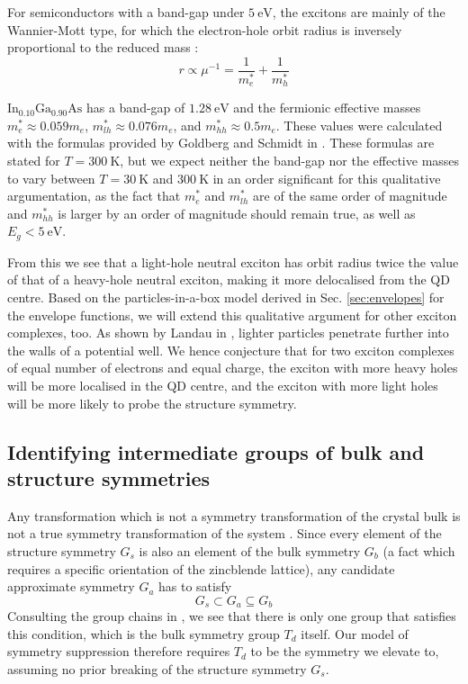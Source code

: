 For semiconductors with a band-gap under $\SI{5}{\electronvolt}$, the excitons are mainly of the Wannier-Mott type, for which the electron-hole orbit radius is inversely proportional to the reduced mass \cite[p. 78]{fox}:
\begin{equation}
r\propto \mu^{-1} = \frac{1}{m_e^*}+\frac{1}{m_h^*}
\end{equation}

$\text{In}_{0.10}\text{Ga}_{0.90}\text{As}$ has a band-gap of $\SI{1.28}{\electronvolt}$ and the fermionic effective masses $m^*_e\approx 0.059m_e$, $m^*_{lh}\approx 0.076m_e$, and $m^*_{hh}\approx 0.5m_e$. These values were calculated with the formulas provided by Goldberg and Schmidt in \cite[p. 62]{semiconductor_handbook}. These formulas are stated for $T=\SI{300}{\kelvin}$, but we expect neither the band-gap nor the effective masses to vary between $T=\SI{30}{\kelvin}$ and $\SI{300}{\kelvin}$ in an order significant for this qualitative argumentation, as the fact that $m_e^*$ and $m_{lh}^*$ are of the same order of magnitude and $m_{hh}^*$ is larger by an order of magnitude should remain true, as well as $E_g < \SI{5}{\electronvolt}$.

From this we see that a light-hole neutral exciton has orbit radius twice the value of that of a heavy-hole neutral exciton, making it more delocalised from the QD centre. Based on the particles-in-a-box model derived in Sec. \ref{sec:envelopes} for the envelope functions, we will extend this qualitative argument for other exciton complexes, too. As shown by Landau in \cite[p. 64]{landau}, lighter particles penetrate further into the walls of a potential well. We hence conjecture that for two exciton complexes of equal number of electrons and equal charge, the exciton with more heavy holes will be more localised in the QD centre, and the exciton with more light holes will be more likely to probe the structure symmetry.

\subsection{Identifying intermediate groups of bulk and structure symmetries}
Any transformation which is not a symmetry transformation of the crystal bulk is not a true symmetry transformation of the system \cite{bulk_limiting}. Since every element of the structure symmetry $G_s$ is also an element of the bulk symmetry $G_b$ (a fact which requires a specific orientation of the zincblende lattice), any candidate approximate symmetry $G_a$ has to satisfy
\begin{equation} \label{eq:group_chain}
G_s \subset G_a \subseteq G_b
\end{equation}
Consulting the group chains in \cite[Ch.9]{altmann}, we see that there is only one group that satisfies this condition, which is the bulk symmetry group $T_d$ itself. Our model of symmetry suppression therefore requires $T_d$ to be the symmetry we elevate to, assuming no prior breaking of the structure symmetry $G_s$.

